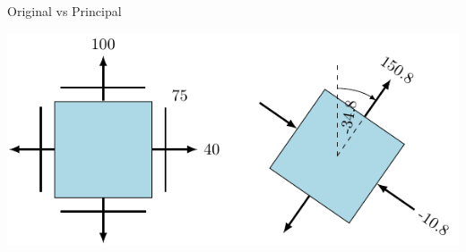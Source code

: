 \documentclass[10pt, svgnames]{beamer}
\begin{document}
\begin{frame}[label={sec:org11fb7a4}]{Original vs Principal}
\begin{center}
\includegraphics[width=.9\linewidth]{pictures/orig-vs-principal.pdf}
\end{center}
\end{frame}
\end{document}

